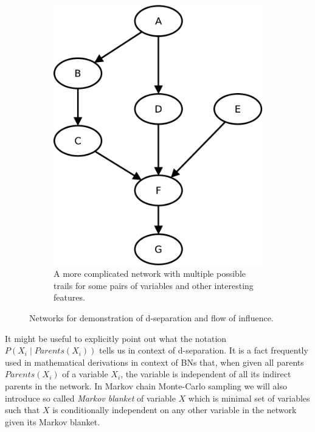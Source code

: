 \documentclass[english,cover]{fitthesis} %
\newcommand{\term}[1]{\emph{#1}}           %
\begin{document}
\begin{center}
\begin{figure}[h]
    \begin{subfigure}[b]{0.42\linewidth}
        \vspace{0.5cm}
        \includegraphics[scale=0.4]{fig/bn-d_sep-abstract}
        \caption{A more complicated network with multiple possible trails for some pairs of variables and other interesting features.}
        \label{fig:bn_d-separation_abstract}
    \end{subfigure}
    
    \caption{Networks for demonstration of d-separation and flow of influence.}
    \label{fig:bn_d-separation}
\end{figure}
\end{center}

It might be useful to explicitly point out what the notation $P(X_i \mid Parents(X_i))$ tells us in context of d-separation. It is a fact frequently used in mathematical derivations in context of BNs that, when given all parents $Parents(X_i)$ of a variable $X_i$, the variable is independent of all its indirect parents in the network. In Markov chain Monte-Carlo sampling we will also introduce so called \term{Markov blanket} of variable $X$ which is minimal set of variables such that $X$ is conditionally independent on any other variable in the network given its Markov blanket.
\end{document}
